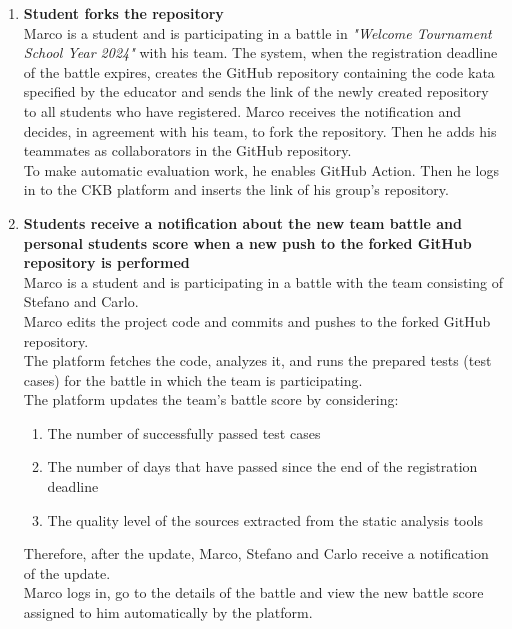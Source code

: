 \begin{enumerate}
	\item \textbf{Student forks the repository}\\
	      Marco is a student and is participating in a battle in \emph{"Welcome Tournament School Year 2024"} with his team.
	      The system, when the registration deadline of the battle expires, creates the GitHub repository containing the code kata specified by the educator and sends the link of the newly created repository to all students who have registered.
	      Marco receives the notification and decides, in agreement with his team, to fork the repository.
	      Then he adds his teammates as collaborators in the GitHub repository.\\
	      To make automatic evaluation work, he enables GitHub Action.
	      Then he logs in to the CKB platform and inserts the link of his group's repository.

	\item \textbf{Students receive a notification about the new team battle and personal students score when a new push to the forked GitHub repository is performed}\\
	      Marco is a student and is participating in a battle with the team consisting of Stefano and Carlo.\\
	      Marco edits the project code and commits and pushes to the forked GitHub repository. \\
	      The platform fetches the code, analyzes it, and runs the prepared tests (test cases) for the battle in which the team is participating.\\
	      The platform updates the team's battle score by considering:
	      \begin{enumerate}
		      \item The number of successfully passed test cases
		      \item The number of days that have passed since the end of the registration deadline
		      \item The quality level of the sources extracted from the static analysis tools
	      \end{enumerate}
	      Therefore, after the update, Marco, Stefano and Carlo receive a notification of the update.\\
	      Marco logs in, go to the details of the battle and view the new battle score assigned to him automatically by the platform.\\


\end{enumerate}
